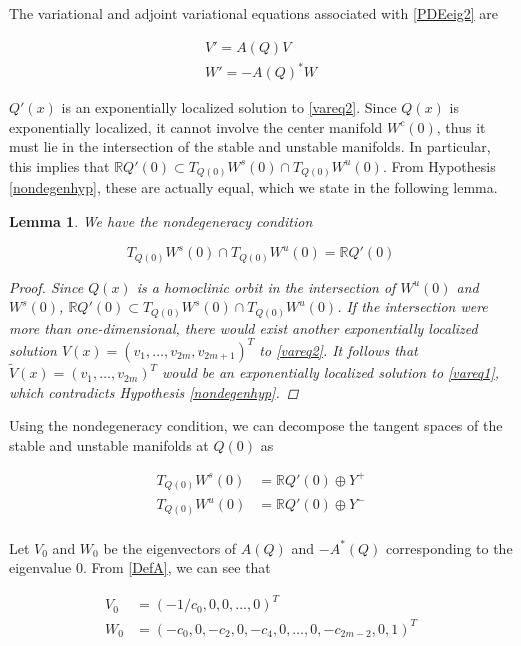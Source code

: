 \documentclass[12pt]{article}
\def\R{{\mathbb R}}
\newtheorem{lemma}{Lemma}
\begin{document}
The variational and adjoint variational equations associated with \eqref{PDEeig2} are

\begin{align}
V' = A(Q) V \label{vareq2} \\
W' = -A(Q)^* W \label{adjvareq2}
\end{align}

$Q'(x)$ is an exponentially localized solution to \eqref{vareq2}. Since $Q(x)$ is exponentially localized, it cannot involve the center manifold $W^c(0)$, thus it must lie in the intersection of the stable and unstable manifolds. In particular, this implies that $\R Q'(0) \subset T_{Q(0)}W^s(0) \cap T_{Q(0)}W^u(0)$. From Hypothesis \ref{nondegenhyp}, these are actually equal, which we state in the following lemma.

\begin{lemma}\label{nondegenlemma}
We have the nondegeneracy condition

\begin{equation}\label{nondegen2}
T_{Q(0)}W^s(0) \cap T_{Q(0)}W^u(0) = \R Q'(0)
\end{equation}

\begin{proof}
Since $Q(x)$ is a homoclinic orbit in the intersection of $W^u(0)$ and $W^s(0)$, $\R Q'(0) \subset T_{Q(0)}W^s(0) \cap T_{Q(0)}W^u(0)$. If the intersection were more than one-dimensional, there would exist another exponentially localized solution $V(x) = (v_1, \dots, v_{2m}, v_{2m+1})^T$ to \eqref{vareq2}. It follows that $\tilde{V}(x) = (v_1, \dots, v_{2m})^T$ would be an exponentially localized solution to \eqref{vareq1}, which contradicts Hypothesis \ref{nondegenhyp}.
\end{proof}
\end{lemma}

Using the nondegeneracy condition, we can decompose the tangent spaces of the stable and unstable manifolds at $Q(0)$ as

\begin{align*}
T_{Q(0)}W^s(0) &= \R Q'(0) \oplus Y^+ \\
T_{Q(0)}W^u(0) &= \R Q'(0) \oplus Y^- \\
\end{align*}

Let $V_0$ and $W_0$ be the eigenvectors of $A(Q)$ and $-A^*(Q)$ corresponding to the eigenvalue 0. From \eqref{DefA}, we can see that

\begin{align}
V_0 &= (-1/c_0, 0, 0, \dots, 0)^T \label{V0} \\
W_0 &= (-c_0, 0, -c_2, 0, -c_4, 0, \dots, 0, -c_{2m-2}, 0, 1)^T \label{W0}
\end{align}
\end{document}
